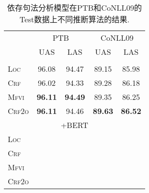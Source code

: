 \begin{table}[tb!]
  \centering
  \caption{依存句法分析模型在PTB和CoNLL09的Test数据上不同推断算法的结果.}
  \begin{tabular}{lcccc}
    \toprule
                   & \multicolumn{2}{c}{PTB} & \multicolumn{2}{c}{CoNLL09}                                   \\
                   & UAS                     & LAS                         & UAS            & LAS            \\[2pt]
    \midrule
    \\[-15pt]
    \textsc{Loc}   & 96.08                   & 94.47                       & 89.15          & 85.98          \\
    \textsc{Crf}   & 96.02                   & 94.33                       & 89.28          & 86.18          \\
    \textsc{Mfvi}  & \textbf{96.11}          & \textbf{94.49}              & 89.35          & 86.25          \\
    \textsc{Crf2o} & \textbf{96.11}          & 94.46                       & \textbf{89.63} & \textbf{86.52} \\
    \multicolumn{5}{c}{+BERT}                                                                                \\[3pt]
    \textsc{Loc}   &                                                                                         \\
    \textsc{Crf}   &                                                                                         \\
    \textsc{Mfvi}  &                                                                                         \\
    \textsc{Crf2o} &                                                                                         \\
    \bottomrule
  \end{tabular}
  \label{table:vi-dep-test}
\end{table}


